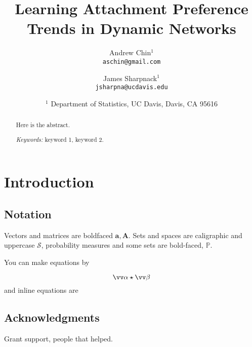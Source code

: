 \documentclass[twoside,11pt]{article}
\newcommand{\pp}{\mathbb} %
\newcommand{\cc}{\mathcal} %
\def\beq{\begin{equation}} %
\def\eeq{\end{equation}}
\newcommand{\teq}[1]{\smash{$#1$}}
\begin{document}
\title{Learning Attachment Preference Trends in Dynamic Networks}
\author{
Andrew Chin$^{1}$\\
{\tt aschin@gmail.com}\\
\and
James Sharpnack$^{1}$ \\
{\tt  jsharpna@ucdavis.edu} \\
\and
\begin{tabular}{c}
  $^{1}$ Department of Statistics, UC Davis, Davis, CA 95616\\
\end{tabular}
}

\date{}%
\maketitle

\begin{abstract}
Here is the abstract.

\medskip\noindent
{\em Keywords:} keyword 1, keyword 2.
\end{abstract}


\section{Introduction}
\label{sec:intro}

\subsection{Notation}
Vectors and matrices are boldfaced $\bm a, \bm A$.
Sets and spaces are caligraphic and uppercase $\cc S$, probability measures and some sets are bold-faced, $\pp P$.

You can make equations by 

\beq 
\label{eq:eqname}
\vv \alpha \star \vv \beta
\eeq
and inline equations are \teq{\sum \alpha + \beta}


\subsection*{Acknowledgments}

Grant support, people that helped.



\end{document}
